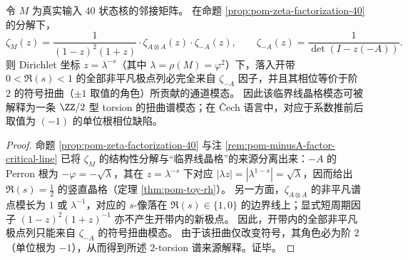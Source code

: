\begin{proposition}\label{prop:pom-toy-rh-2torsion-source}
令 \(M\) 为真实输入 \(40\) 状态核的邻接矩阵。
在命题 \ref{prop:pom-zeta-factorization-40} 的分解下，
\[
\zeta_M(z)
=
\frac{1}{(1-z)^2(1+z)}\cdot \zeta_{A\otimes A}(z)\cdot \zeta_{-A}(z),
\qquad
\zeta_{-A}(z)=\frac{1}{\det(I-z(-A))}.
\]
则 Dirichlet 坐标 \(z=\lambda^{-s}\)（其中 \(\lambda=\rho(M)=\varphi^2\)）下，落入开带 \(0<\Re(s)<1\) 的全部非平凡极点列必完全来自 \(\zeta_{-A}\) 因子，并且其相位等价于阶 \(2\) 的符号扭曲（\(\pm 1\) 取值的角色）所贡献的通道模态。
因此该临界线晶格模态可被解释为一条 \(\ZZ/2\) 型 torsion 的扭曲谱模态；在 \v{C}ech 语言中，对应于系数推前后取值为 \((-1)\) 的单位根相位缺陷。
\end{proposition}

\begin{proof}
命题 \ref{prop:pom-zeta-factorization-40} 与注 \ref{rem:pom-minusA-factor-critical-line} 已将 \(\zeta_M\) 的结构性分解与“临界线晶格”的来源分离出来：\(-A\) 的 Perron 根为 \(-\varphi=-\sqrt{\lambda}\)，其在 \(z=\lambda^{-s}\) 下对应 \(|\lambda z|=|\lambda^{1-s}|=\sqrt{\lambda}\)，因而给出 \(\Re(s)=\tfrac12\) 的竖直晶格（定理 \ref{thm:pom-toy-rh}）。
另一方面，\(\zeta_{A\otimes A}\) 的非平凡谱点模长为 \(1\) 或 \(\lambda^{-1}\)，对应的 \(s\)-像落在 \(\Re(s)\in\{1,0\}\) 的边界线上；显式短周期因子 \((1-z)^2(1+z)^{-1}\) 亦不产生开带内的新极点。
因此，开带内的全部非平凡极点列只能来自 \(\zeta_{-A}\) 的符号扭曲模态。
由于该扭曲仅改变符号，其角色必为阶 \(2\)（单位根为 \(-1\)），从而得到所述 \(2\)-torsion 谱来源解释。证毕。
\end{proof}

\endinput
